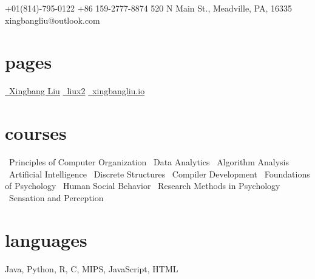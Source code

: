 \documentclass[]{friggeri-cv}
\begin{document}
       {
       \faMobilePhone\hspace{1mm} +01(814)-795-0122 \hspace{0.1cm} 			   \faMobilePhone\hspace{1mm} +86 159-2777-8874 \hspace{0.1cm}
       520 N Main St., Meadville, PA, 16335 \hspace{0.1cm} 					\faEnvelope\hspace{1.5mm}xingbangliu@outlook.com
       }

\begin{aside}
  \section{pages}\vspace{0.05cm}
    \href{https://www.linkedin.com/in/liux2}{\faLinkedin\ Xingbang Liu}\vspace{0.03cm}
    \href{https://github.com/liux2}{\faGithub\ liux2}\vspace{0.03cm}
    \href{https://xingbangliu.io/}{\faGlobe\ xingbangliu.io}\vspace{0.03cm}
  \section{courses}\vspace{0.05cm}
  \bullet\ Principles of Computer Organization\vspace{0.1cm}
  \bullet\ Data Analytics\vspace{0.1cm}
  \bullet\ Algorithm Analysis\vspace{0.1cm}
  \bullet\ Artificial Intelligence\vspace{0.1cm}
  \bullet\ Discrete Structures\vspace{0.1cm}
  \bullet\ Compiler Development\vspace{0.1cm}
  \bullet\ Foundations of Psychology\vspace{0.1cm}
  \bullet\ Human Social Behavior\vspace{0.1cm}
  \bullet\ Research Methods in Psychology\vspace{0.1cm}
  \bullet\ Sensation and Perception\vspace{0.1cm}
  \section{languages}\vspace{0.05cm}
    Java, Python, R, C, MIPS, JavaScript, HTML\vspace{0.1cm}

\end{aside}
\end{document}
